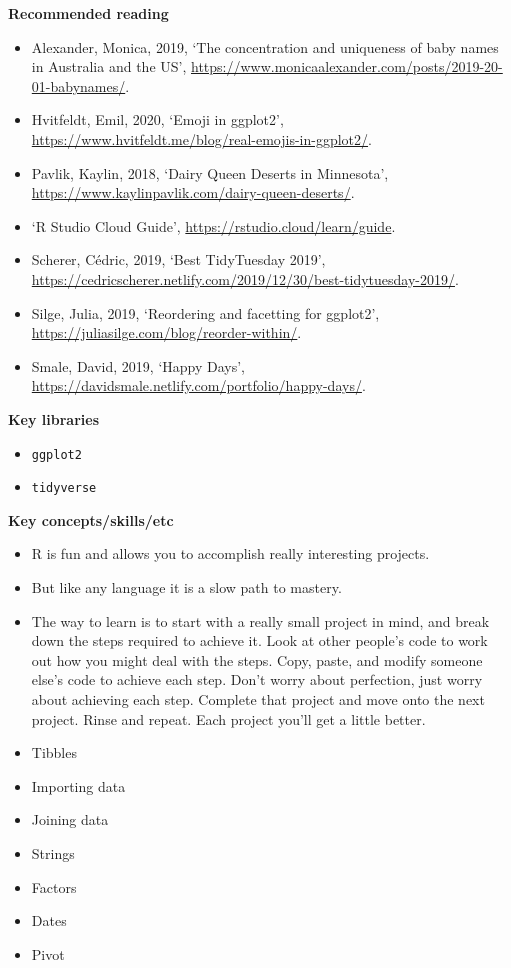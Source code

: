 \documentclass[
]{book}
\providecommand{\tightlist}{%
  \setlength{\itemsep}{0pt}\setlength{\parskip}{0pt}}
\begin{document}
\textbf{Recommended reading}

\begin{itemize}
\tightlist
\item
  Alexander, Monica, 2019, `The concentration and uniqueness of baby names in Australia and the US', \url{https://www.monicaalexander.com/posts/2019-20-01-babynames/}.
\item
  Hvitfeldt, Emil, 2020, `Emoji in ggplot2', \url{https://www.hvitfeldt.me/blog/real-emojis-in-ggplot2/}.
\item
  Pavlik, Kaylin, 2018, `Dairy Queen Deserts in Minnesota', \url{https://www.kaylinpavlik.com/dairy-queen-deserts/}.
\item
  `R Studio Cloud Guide', \url{https://rstudio.cloud/learn/guide}.
\item
  Scherer, Cédric, 2019, `Best TidyTuesday 2019', \url{https://cedricscherer.netlify.com/2019/12/30/best-tidytuesday-2019/}.
\item
  Silge, Julia, 2019, `Reordering and facetting for ggplot2', \url{https://juliasilge.com/blog/reorder-within/}.
\item
  Smale, David, 2019, `Happy Days', \url{https://davidsmale.netlify.com/portfolio/happy-days/}.
\end{itemize}

\textbf{Key libraries}

\begin{itemize}
\tightlist
\item
  \texttt{ggplot2}
\item
  \texttt{tidyverse}
\end{itemize}

\textbf{Key concepts/skills/etc}

\begin{itemize}
\tightlist
\item
  R is fun and allows you to accomplish really interesting projects.
\item
  But like any language it is a slow path to mastery.
\item
  The way to learn is to start with a really small project in mind, and break down the steps required to achieve it. Look at other people's code to work out how you might deal with the steps. Copy, paste, and modify someone else's code to achieve each step. Don't worry about perfection, just worry about achieving each step. Complete that project and move onto the next project. Rinse and repeat. Each project you'll get a little better.
\item
  Tibbles
\item
  Importing data
\item
  Joining data
\item
  Strings
\item
  Factors
\item
  Dates
\item
  Pivot
\end{itemize}
\end{document}
